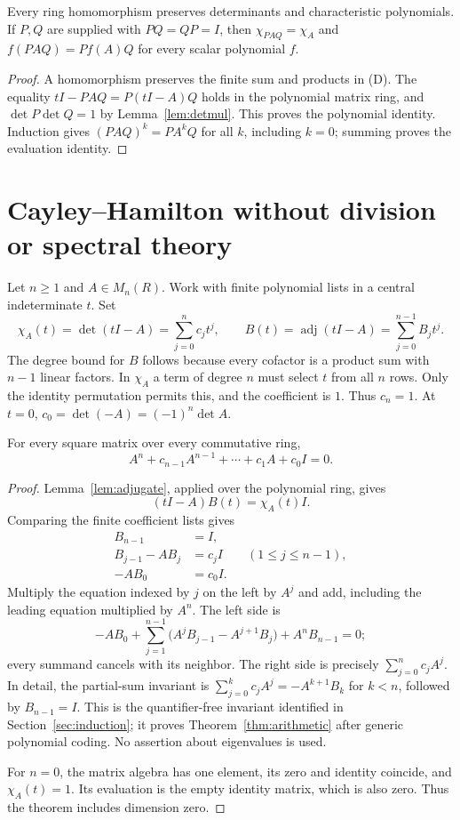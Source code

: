 \begin{corollary}
Every ring homomorphism preserves determinants and characteristic
polynomials. If $P,Q$ are supplied with $PQ=QP=I$, then
$\chi_{PAQ}=\chi_A$ and $f(PAQ)=P f(A)Q$ for every scalar polynomial $f$.
\end{corollary}
\begin{proof}
A homomorphism preserves the finite sum and products in (D).
The equality $tI-PAQ=P(tI-A)Q$ holds in the polynomial matrix ring, and
$\det P\det Q=1$ by Lemma~\ref{lem:detmul}. This proves the polynomial
identity. Induction gives $(PAQ)^k=PA^kQ$ for all $k$, including $k=0$;
summing proves the evaluation identity.
\end{proof}

\section{Cayley--Hamilton without division or spectral theory}
\label{sec:main}

Let $n\ge1$ and $A\in M_n(R)$. Work with finite polynomial lists in a
central indeterminate $t$. Set
\[
 \chi_A(t)=\det(tI-A)=\sum_{j=0}^n c_jt^j,
 \qquad B(t)=\operatorname{adj}(tI-A)=\sum_{j=0}^{n-1}B_jt^j.
\]
The degree bound for $B$ follows because every cofactor is a product
sum with $n-1$ linear factors. In $\chi_A$ a term of degree $n$ must
select $t$ from all $n$ rows. Only the identity permutation permits this,
and the coefficient is $1$. Thus $c_n=1$. At $t=0$,
$c_0=\det(-A)=(-1)^n\det A$.

\begin{theorem}
\label{thm:CH}
For every square matrix over every commutative ring,
\[
       \boxed{\;A^n+c_{n-1}A^{n-1}+\cdots+c_1A+c_0I=0.\;}
\]
\end{theorem}
\begin{proof}
Lemma~\ref{lem:adjugate}, applied over the polynomial ring, gives
\[
                    (tI-A)B(t)=\chi_A(t)I.
\]
Comparing the finite coefficient lists gives
\begin{align*}
 B_{n-1}&=I,\\
 B_{j-1}-AB_j&=c_jI &&(1\le j\le n-1),\\
 -AB_0&=c_0I.
\end{align*}
Multiply the equation indexed by $j$ on the left by $A^j$ and add,
including the leading equation multiplied by $A^n$. The left side is
\[
 -AB_0+\sum_{j=1}^{n-1}
       \bigl(A^jB_{j-1}-A^{j+1}B_j\bigr)+A^nB_{n-1}=0;
\]
every summand cancels with its neighbor. The right side is precisely
$\sum_{j=0}^n c_jA^j$. In detail, the partial-sum invariant is
$\sum_{j=0}^k c_jA^j=-A^{k+1}B_k$ for $k<n$, followed by
$B_{n-1}=I$. This is the quantifier-free invariant identified in
Section~\ref{sec:induction}; it proves Theorem~\ref{thm:arithmetic} after
generic polynomial coding. No assertion about eigenvalues is used.

For $n=0$, the matrix algebra has one element, its zero and identity
coincide, and $\chi_A(t)=1$. Its evaluation is the empty identity matrix,
which is also zero. Thus the theorem includes dimension zero.
\end{proof}

